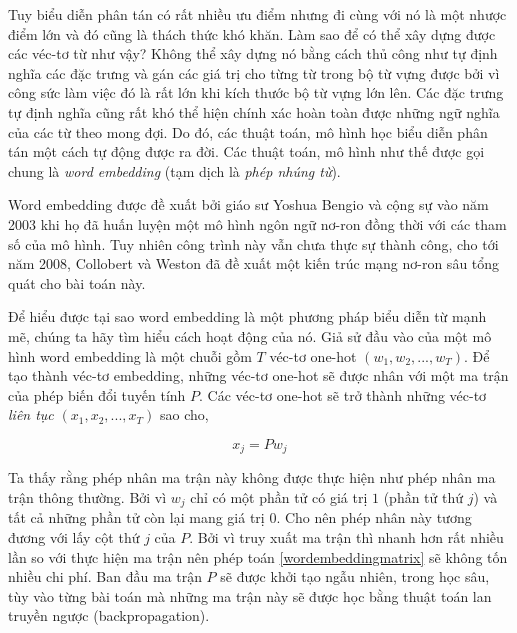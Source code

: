 Tuy biểu diễn phân tán có rất nhiều ưu điểm nhưng đi cùng với nó là một nhược điểm lớn và đó cũng là thách thức khó khăn. Làm sao để có thể xây dựng được các véc-tơ từ như vậy? Không thể xây dựng nó bằng cách thủ công như tự định nghĩa các đặc trưng và gán các giá trị cho từng từ trong bộ từ vựng được bởi vì công sức làm việc đó là rất lớn khi kích thước bộ từ vựng lớn lên. Các đặc trưng tự định nghĩa cũng rất khó thể hiện chính xác hoàn toàn được những ngữ nghĩa của các từ theo mong đợi. Do đó, các thuật toán, mô hình học biểu diễn phân tán một cách tự động được ra đời. Các thuật toán, mô hình như thế được gọi chung là \textit{word embedding} (tạm dịch là \textit{phép nhúng từ}).

Word embedding được đề xuất bởi giáo sư Yoshua Bengio và cộng sự vào năm 2003 \cite{wordembeddingBengio2003} khi họ đã huấn luyện một mô hình ngôn ngữ nơ-ron đồng thời với các tham số của mô hình. Tuy nhiên công trình này vẫn chưa thực sự thành công, cho tới năm 2008, Collobert và Weston \cite{wordembeddingCollobert2008} đã đề xuất một kiến trúc mạng nơ-ron sâu tổng quát cho bài toán này.

Để hiểu được tại sao word embedding là một phương pháp biểu diễn từ mạnh mẽ, chúng ta hãy tìm hiểu cách hoạt động của nó. Giả sử đầu vào của một mô hình word embedding là một chuỗi gồm $T$ véc-tơ one-hot $(w_1,w_2,...,w_{T})$. Để tạo thành véc-tơ embedding, những véc-tơ one-hot sẽ được nhân với một ma trận của phép biến đổi tuyến tính $P$. Các véc-tơ one-hot sẽ trở thành những véc-tơ \textit{liên tục} $(x_1, x_2,...,x_{T})$ sao cho,

\begin{equation} \label{wordembeddingmatrix}
	x_j = Pw_j
\end{equation}

Ta thấy rằng phép nhân ma trận này không được thực hiện như phép nhân ma trận thông thường. Bởi vì $w_j$ chỉ có một phần tử có giá trị $1$ (phần tử thứ $j$) và tất cả những phần tử còn lại mang giá trị $0$. Cho nên phép nhân này tương đương với lấy cột thứ $j$ của $P$. Bởi vì truy xuất ma trận thì nhanh hơn rất nhiều lần so với thực hiện ma trận nên phép toán \ref{wordembeddingmatrix} sẽ không tốn nhiều chi phí. Ban đầu ma trận $P$ sẽ được khởi tạo ngẫu nhiên, trong học sâu, tùy vào từng bài toán mà những ma trận này sẽ được học bằng thuật toán lan truyền ngược (backpropagation).


